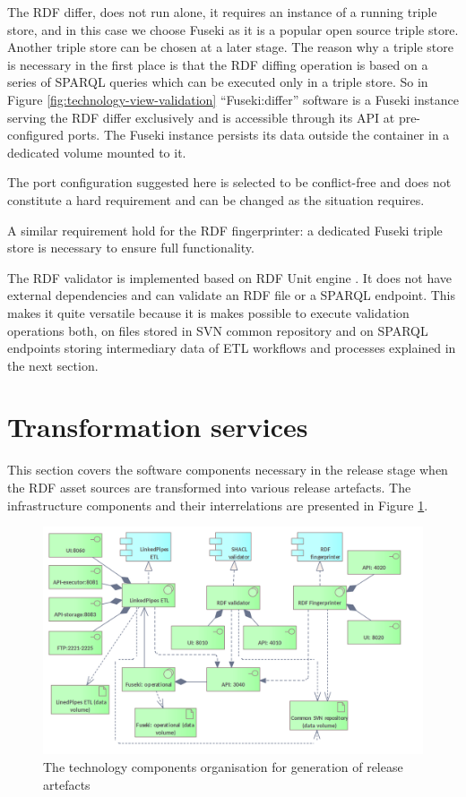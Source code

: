 	The RDF differ, does not run alone, it requires an instance of a running triple store, and in this case we choose Fuseki as it is a popular open source triple store. Another triple store can be chosen at a later stage. The reason why a triple store is necessary in the first place is that the RDF diffing operation is based on a series of SPARQL queries which can be executed only in a triple store. So in Figure \ref{fig:technology-view-validation} ``Fuseki:differ'' software is a Fuseki instance serving the RDF differ exclusively and is accessible through its API at pre-configured ports. The Fuseki instance persists its data outside the container in a dedicated volume mounted to it. 
	
	The port configuration suggested here is selected to be conflict-free and does not constitute a hard requirement and can be changed as the situation requires.
	
	A similar requirement hold for the RDF fingerprinter: a dedicated Fuseki triple store is necessary to ensure full functionality. 
	
	The RDF validator is implemented based on RDF Unit engine \citep{rdfunit-kontokostasDatabugger}. It does not have external dependencies and can validate an RDF file or a SPARQL endpoint. This makes it quite versatile because it is makes possible to execute validation operations both, on files stored in SVN common repository and on SPARQL endpoints storing intermediary data of ETL workflows and processes explained in the next section. 
	
	\section{Transformation services}
	\label{sec:technology-view-transformation}
	
	This section covers the software components necessary in the release stage when the RDF asset sources are transformed into various release artefacts. The infrastructure components and their interrelations are presented in Figure \ref{fig:technology-view-transformation}. 
	
	\begin{figure}[!h]
		\centering
		\includegraphics[width=.9\textwidth]{images/infra-setup/transformation.png}
		\caption{The technology components organisation for generation of release artefacts}
		\label{fig:technology-view-transformation}
	\end{figure}

